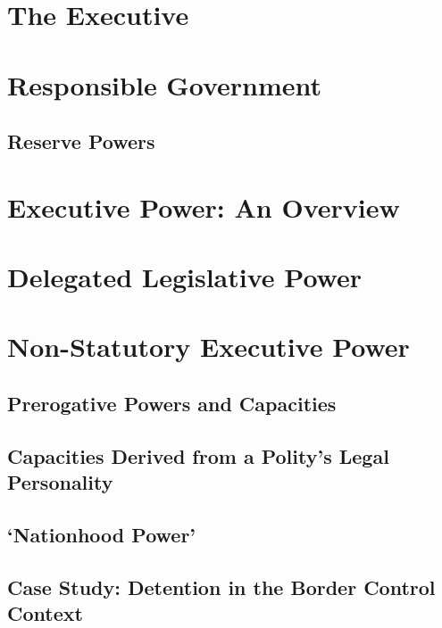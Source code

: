 \section{The Executive}

\section{Responsible Government}

\subsection{Reserve Powers}

\section{Executive Power: An Overview}

\section{Delegated Legislative Power}

\section{Non-Statutory Executive Power}

\subsection{Prerogative Powers and Capacities}

\subsection{Capacities Derived from a Polity's Legal Personality}

\subsection{`Nationhood Power'}

\subsection{Case Study: Detention in the Border Control Context}